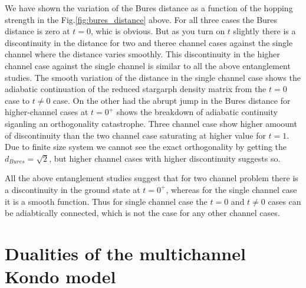 \documentclass[reprint,prb,superscriptaddress]{revtex4-1}
\begin{document}
We have shown the variation of the Bures distance as a function of the hopping strength in the Fig.\ref{fig:bures_distance} above. For all three cases the Bures distance is zero at $t=0$, whic is obvious. But as you turn on $t$ slightly there is a discontinuity in the distance for two and theree channel cases against the single channel where the distance varies smoothly. This discontinuity in the higher channel case against the single channel is similar to all the above entanglement studies. The smooth variation of the distance in the single channel case shows the adiabatic continuation of the reduced stargarph density matrix from the $t=0$ case to $t\neq 0$ case. On the other had the abrupt jump in the Bures distance for higher-channel cases at $t=0^+$ shows the breakdown of adiabatic continuity siganling an orthogonality catastrophe. Three channel case show higher amoount of discontinuity than the two channel case saturating at higher value for $t=1$. Due to finite size system we cannot see the exact orthogonality by getting the $d_{Bures}=\sqrt{2}$, but higher channel cases with higher discontinuity suggests so.

\par All the above  entanglement studies suggest that for two channel problem there is a discontinuity in the ground state at $t=0^{+}$, whereas for the single channel case it is a smooth function. Thus for single channel case the $t=0$ and $t\neq 0$ cases can be adiabtically connected, which is not the case for any other channel cases. 

\section{Dualities of the multichannel Kondo model}
\label{sec:duality}
\end{document}
